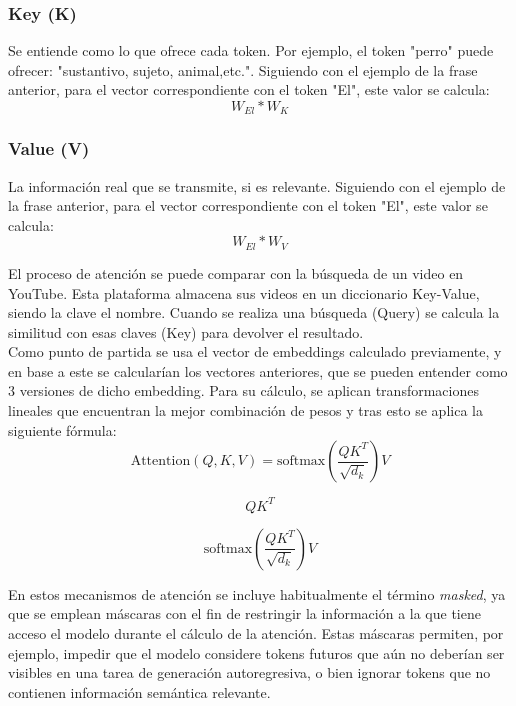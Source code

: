 \documentclass[11pt]{book}
\begin{document}
\subsubsection{Key (K)}
Se entiende como lo que ofrece cada token. Por ejemplo, el token "perro" puede ofrecer: "sustantivo, sujeto, animal,etc.". Siguiendo con el ejemplo de la frase anterior, para el vector correspondiente con el token "El", este valor se calcula: \[W_{El} * W_{K}\]

\subsubsection{Value (V)}
La información real que se transmite, si es relevante. Siguiendo con el ejemplo de la frase anterior, para el vector correspondiente con el token "El", este valor se calcula: \[W_{El} * W_{V}\]

El proceso de atención se puede comparar con la búsqueda de un video en YouTube. Esta plataforma almacena sus videos en un diccionario Key-Value, siendo la clave el nombre. Cuando se realiza una búsqueda (Query) se calcula la similitud con esas claves (Key) para devolver el resultado. \\
Como punto de partida se usa el vector de embeddings calculado previamente, y en base a este se calcularían los vectores anteriores, que se pueden entender como 3 versiones de dicho embedding. Para su cálculo, se aplican transformaciones lineales que encuentran la mejor combinación de pesos y tras esto se aplica la siguiente fórmula:
\[
\text{Attention}(Q, K, V) = \text{softmax}\!\left(\frac{QK^{T}}{\sqrt{d_k}}\right)V
\]

\[
QK^{T}
\]
\noindent{}

\[
\mathrm{softmax}\!\left(\frac{QK^{T}}{\sqrt{d_k}}\right)V
\]
\noindent{}

En estos mecanismos de atención se incluye habitualmente el término \textit{masked}, ya que se emplean máscaras con el fin de restringir la información a la que tiene acceso el modelo durante el cálculo de la atención. Estas máscaras permiten, por ejemplo, impedir que el modelo considere tokens futuros que aún no deberían ser visibles en una tarea de generación autoregresiva, o bien ignorar tokens que no contienen información semántica relevante. 
\end{document}
